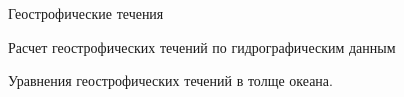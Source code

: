 \begin{chapter}{Геострофические течения}
\begin{section}{Расчет геострофических течений по гидрографическим данным}
\begin{paragraph}{Уравнения геострофических течений в толще океана.}
%


\end{paragraph}
\end{section}
\end{chapter}
